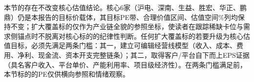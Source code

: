 本节的存在不改变核心估值结论。核心6家（沪电、深南、生益、胜宏、华正、鹏鼎）仍是本报告的目标价载体，其目标PE带、合理价值区间、估值空间\%列均保持不变；扩大覆盖标的仅作为产业链全貌的参照坐标，使读者在跟踪稀缺卡位与需求侧锚点时不脱离对核心标的的纪律性判断。任何扩大覆盖标的若要升级为核心估值目标，必须先满足两条门槛：其一，建立可编辑经营线模型（收入、成本、费用、净利、现金流、资本开支完整链条）；其二，取得客户/平台自下而上EPS证据（具名客户收入、平台单价、产能利用率、项目级经济性）。在两条门槛满足前，本节标的的PE仅供横向参照和情绪观察。

